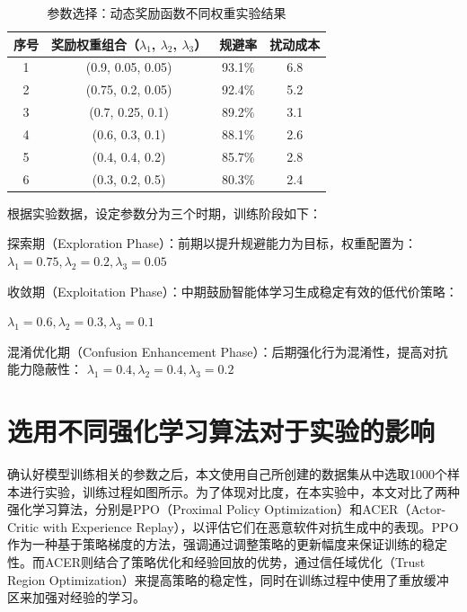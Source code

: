 \renewcommand{\arraystretch}{1.3}
\begin{table}[htbp]
	\centering
	\caption{参数选择：动态奖励函数不同权重实验结果}
	\label{tab:5.8}
	\begin{tabular*}{0.9\textwidth}{@{\extracolsep{\fill}}cccc}
		\toprule
		序号 & 奖励权重组合（$\lambda_1$, $\lambda_2$, $\lambda_3$） & 规避率 & 扰动成本 \\
		\midrule
		1 & (0.9, 0.05, 0.05) & 93.1\% & 6.8 \\
		2 & (0.75, 0.2, 0.05) & 92.4\% & 5.2 \\
		3 & (0.7, 0.25, 0.1) & 89.2\% & 3.1 \\
		4 & (0.6, 0.3, 0.1) & 88.1\% & 2.6 \\
		5 & (0.4, 0.4, 0.2) & 85.7\% & 2.8 \\
		6 & (0.3, 0.2, 0.5) & 80.3\% & 2.4 \\
		\bottomrule
	\end{tabular*}
\end{table}

根据实验数据，设定参数分为三个时期，训练阶段如下：


探索期（Exploration Phase）：前期以提升规避能力为目标，权重配置为：$\lambda_1= 0.75, \lambda_2 = 0.2, \lambda_3=0.05$


收敛期（Exploitation Phase）：中期鼓励智能体学习生成稳定有效的低代价策略：

$\lambda_1= 0.6, \lambda_2 = 0.3, \lambda_3=0.1$

混淆优化期（Confusion Enhancement Phase）：后期强化行为混淆性，提高对抗能力隐蔽性：
$\lambda_1= 0.4, \lambda_2 = 0.4, \lambda_3=0.2$

\section{选用不同强化学习算法对于实验的影响}

确认好模型训练相关的参数之后，本文使用自己所创建的数据集从中选取1000个样本进行实验，训练过程如图所示。为了体现对比度，在本实验中，本文对比了两种强化学习算法，分别是PPO（Proximal Policy Optimization）和ACER\cite{wang2016sample}（Actor-Critic with Experience Replay），以评估它们在恶意软件对抗生成中的表现。PPO作为一种基于策略梯度的方法，强调通过调整策略的更新幅度来保证训练的稳定性。而ACER则结合了策略优化和经验回放的优势，通过信任域优化（Trust Region Optimization）来提高策略的稳定性，同时在训练过程中使用了重放缓冲区来加强对经验的学习。


